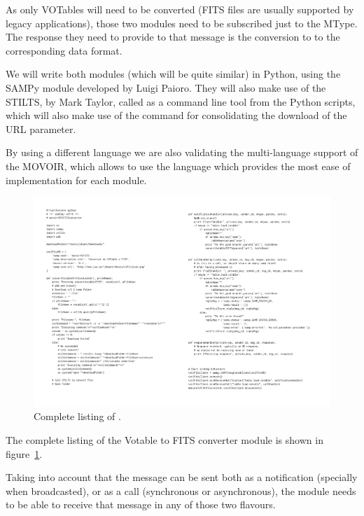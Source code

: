 			As only VOTables will need to be converted (FITS files
			are usually supported by legacy applications), those two
			modules need to be subscribed just to the
			 MType. The response they
			need to provide to that message is the conversion to
			to the corresponding data format.
			
			We will write both modules (which will be quite similar)
			in Python, using the
			SAMPy\urlnote{\sampyurl} module developed by Luigi
			Paioro. They will also make use of the
			STILTS\urlnote{\stiltsurl}, by Mark Taylor, called as a
			command line tool from the Python scripts, which will also
			make use of the  command for consolidating the
			download of the URL parameter.
			
			By using a different language we are also validating the
			multi-language support of the MOVOIR, which allows to use
			the language which provides the most ease of implementation
			for each module.
			
			\begin{figure}[tbp]
				\centering
					\includegraphics[width=\textwidth]
					{fig/movoirVOT2FITSconvert.pdf}
				\caption[Listing of
				]
				{Complete listing of
				.}
				\label{fig:fig_movoirVOT2FITSconvert}
			\end{figure}
			
			The complete listing of the Votable to FITS converter
			module is shown in
			figure~\ref{fig:fig_movoirVOT2FITSconvert}.
			
			Taking into account that the 
			message can be sent both as a notification (specially when
			broadcasted), or as a call (synchronous or asynchronous),
			the module needs to be able to receive that message in any
			of those two flavours.
			

